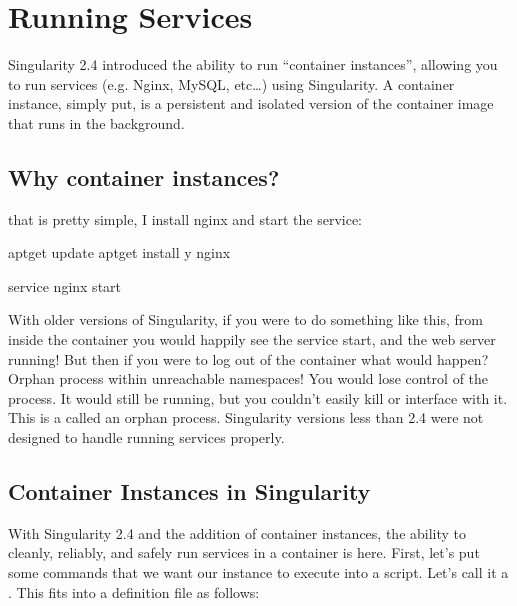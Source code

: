 \documentclass[letterpaper,10pt,english]{sphinxmanual}
\begin{document}
\chapter{Running Services}
\label{\detokenize{running_services:running-services}}\label{\detokenize{running_services:id1}}\label{\detokenize{running_services::doc}}
Singularity 2.4 introduced the ability to run “container instances”,
allowing you to run services (e.g. Nginx, MySQL, etc…) using
Singularity. A container instance, simply put, is a persistent and
isolated version of the container image that runs in the background.


\section{Why container instances?}
\label{\detokenize{running_services:why-container-instances}}
that is pretty simple, I install nginx and start the service:

%
\begin{sphinxVerbatim}[commandchars=\\\{\}]
apt\PYGZhy{}get update \PYGZam{}\PYGZam{} apt\PYGZhy{}get install \PYGZhy{}y nginx

service nginx start
\end{sphinxVerbatim}

With older versions of Singularity, if you were to do something like
this, from inside the container you would happily see the service
start, and the web server running! But then if you were to log out of
the container what would happen?
Orphan process within unreachable namespaces!
You would lose control of the process. It would still be running, but
you couldn’t easily kill or interface with it. This is a called an
orphan process. Singularity versions less than 2.4 were not designed to handle running services properly.


\section{Container Instances in Singularity}
\label{\detokenize{running_services:container-instances-in-singularity}}
With Singularity 2.4 and the addition of container instances, the
ability to cleanly, reliably, and safely run services in a container is
here. First, let’s put some commands that we want our instance to
execute into a script. Let’s call it a . This fits into a definition
file as follows:
\end{document}
